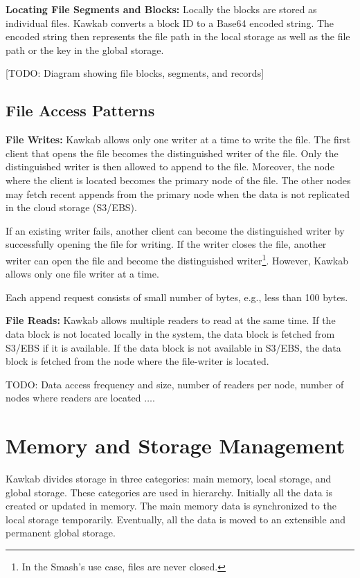 \documentclass[]{article}
\newcommand{\subtopic}[1]{\vspace{1.5pt} \noindent \textbf{#1}}
\begin{document}
\subtopic{Locating File Segments and Blocks:} Locally the blocks are stored as
individual files.  Kawkab converts a block ID to a Base64 encoded string. The
encoded string then represents the file path in the local storage as well as
the file path or the key in the global storage.

[TODO: Diagram showing file blocks, segments, and records]


\subsection{File Access Patterns}

\subtopic{File Writes:} Kawkab allows only one writer at a time to
write the file. The first client that opens the file becomes the distinguished
writer of the file. Only the distinguished writer is then allowed to append to
the file. Moreover, the node where the client is located becomes the primary
node of the file.  The other nodes may fetch recent appends from the primary
node when the data is not replicated in the cloud storage (S3/EBS).

If an existing writer fails, another client can become the distinguished writer
by successfully opening the file for writing. If the writer closes the file,
another writer can open the file and become the distinguished
writer\footnote{In the Smash's use case, files are never closed.}. However,
Kawkab allows only one file writer at a time.

Each append request consists of small number of bytes, e.g., less than 100 bytes.

\subtopic{File Reads:}
Kawkab allows multiple readers to read at the same time. If the data block
is not located locally in the system, the data block is fetched from S3/EBS if
it is available. If the data block is not available in S3/EBS, the data block
is fetched from the node where the file-writer is located.

TODO: Data access frequency and size, number of readers per node, number of
nodes where readers are located $\ldots$.



\section{Memory and Storage Management}

Kawkab divides storage in three categories: main memory, local storage, and global
storage. These categories are used in hierarchy. Initially all the data
is created or updated in memory. The main memory data is synchronized to the
local storage temporarily. Eventually, all the data is moved to an extensible
and permanent global storage.
\end{document}
